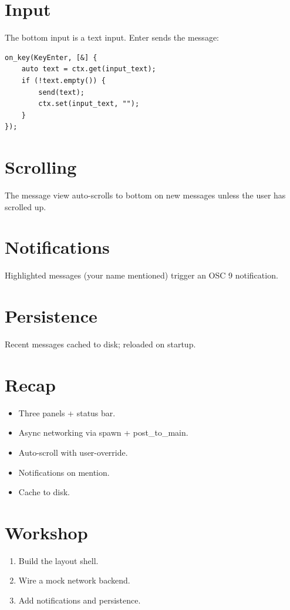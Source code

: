 \section{Input}

The bottom input is a text input. Enter sends the message:

\begin{lstlisting}
on_key(KeyEnter, [&] {
    auto text = ctx.get(input_text);
    if (!text.empty()) {
        send(text);
        ctx.set(input_text, "");
    }
});
\end{lstlisting}

\section{Scrolling}

The message view auto-scrolls to bottom on new messages
unless the user has scrolled up.

\section{Notifications}

Highlighted messages (your name mentioned) trigger an OSC 9
notification.

\section{Persistence}

Recent messages cached to disk; reloaded on startup.

\section{Recap}

\begin{recap}
\begin{itemize}[leftmargin=*]
  \item Three panels + status bar.
  \item Async networking via spawn + post\_to\_main.
  \item Auto-scroll with user-override.
  \item Notifications on mention.
  \item Cache to disk.
\end{itemize}
\end{recap}

\section*{Workshop}

\begin{enumerate}[leftmargin=*]
  \item Build the layout shell.
  \item Wire a mock network backend.
  \item Add notifications and persistence.
\end{enumerate}
